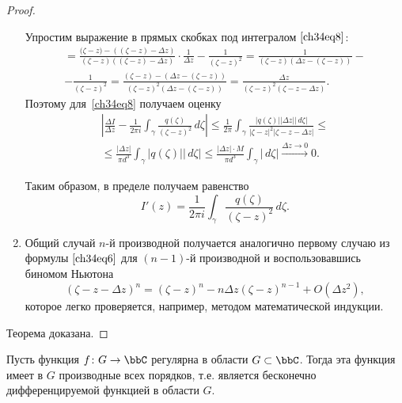 \begin{proof}
\begin{enumerate}[wide]
Упростим выражение в прямых скобках под интегралом $\eqref{ch34eq8}$:
\begin{multline*}
[\ldots] = \frac{{(\zeta} - {z}) - (({\zeta} - {z}) - {\Delta z})}{(\zeta - z)((\zeta - z) - \Delta z)} \cdot \frac{1}{{\Delta z}} - \frac{1}{(\zeta - z)^2} = \frac{1}{(\zeta - z)(\Delta z- (\zeta-z) )} -\\- \frac{1}{(\zeta - z)^2} =
\frac{(\zeta - z)-(\Delta z- (\zeta-z))}{(\zeta - z)^2(\Delta z- (\zeta-z) )}
=\frac{\Delta z}{(\zeta - z)^2 (\zeta - z - \Delta z)} .
\end{multline*}
Поэтому для~\eqref{ch34eq8} получаем оценку 
\begin{multline*}
\left| \frac{\Delta I}{\Delta z} - \frac{1}{2\pi i} \int_\gamma \frac{q(\zeta)}{(\zeta - z)^2}\,d\zeta \right| 
\le \frac{1}{2\pi} \int_\gamma \frac{|q(\zeta)||\Delta z||\,d\zeta|}{|\zeta - z|^2|\zeta - z - \Delta z|} \le \\
\le \frac{|\Delta z|}{\pi d^3} \int_\gamma |q(\zeta)||\,d\zeta| 
\le \frac{|\Delta z| \cdot M}{\pi d^3} \int_\gamma |\,d\zeta| \xrightarrow{\Delta z \to 0} 0.
\end{multline*}

Таким образом, в пределе получаем равенство
\begin{equation} \label{ch34eq9}
I'(z) = \frac{1}{2\pi i} \int_\gamma \frac{q(\zeta)}{(\zeta - z)^2} \,d\zeta.
\end{equation}

\item
Общий случай $n$-й производной получается аналогично первому случаю из формулы $\eqref{ch34eq6}$ для $(n - 1)$-й производной и воспользовавшись биномом Ньютона
$$
(\zeta - z - \Delta z)^n = (\zeta - z)^n - n \Delta z (\zeta - z)^{n - 1} + O(\Delta z^2),
$$
которое легко проверяется, например, методом математической индукции.
\end{enumerate}

Теорема доказана.
\end{proof}
\begin{thm} \label{ch34Thm3}
Пусть функция $f \colon G \to \bbC$ регулярна в области $G \subset \bbC$. Тогда эта функция имеет в $G$ производные всех порядков, т.е. является бесконечно дифференцируемой функцией в области $G$.
\end{thm}

